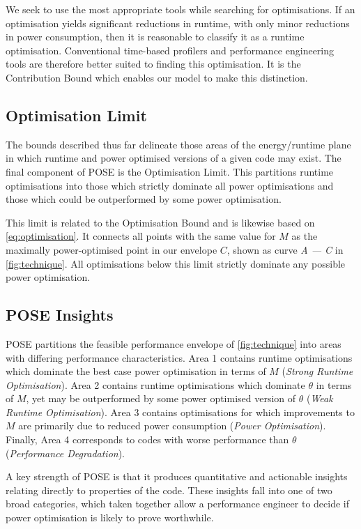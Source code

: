 We seek to use the most appropriate tools while searching for optimisations.
If an optimisation yields significant reductions in runtime, with only minor reductions in power consumption, then it is reasonable to classify it as a runtime optimisation.
Conventional time-based profilers and performance engineering tools are therefore better suited to finding this optimisation.
It is the Contribution Bound which enables our model to make this distinction.

\subsection{Optimisation Limit}
\noindent
The bounds described thus far delineate those areas of the energy/runtime plane in which runtime and power optimised versions of a given code may exist.
The final component of POSE is the Optimisation Limit.
This partitions runtime optimisations into those which strictly dominate all power optimisations and those which could be outperformed by some power optimisation.

This limit is related to the Optimisation Bound and is likewise based on \autoref{eq:optimisation}.
It connects all points with the same value for $M$ as the maximally power-optimised point in our envelope $C$, shown as curve \emph{A --- C} in \autoref{fig:technique}.
All optimisations below this limit strictly dominate any possible power optimisation.

\subsection{POSE Insights}
\noindent

POSE partitions the feasible performance envelope of \autoref{fig:technique} into areas with differing performance characteristics.
Area 1 contains runtime optimisations which dominate the best case power optimisation in terms of $M$ (\emph{Strong Runtime Optimisation}).
Area 2 contains runtime optimisations which dominate $\theta$ in terms of $M$, yet may be outperformed by some power optimised version of $\theta$ (\emph{Weak Runtime Optimisation}).
Area 3 contains optimisations for which improvements to $M$ are primarily due to reduced power consumption (\emph{Power Optimisation}).
Finally, Area 4 corresponds to codes with worse performance than $\theta$ (\emph{Performance Degradation}).

A key strength of POSE is that it produces quantitative and actionable insights relating directly to properties of the code.
These insights fall into one of two broad categories, which taken together allow a performance engineer to decide if power optimisation is likely to prove worthwhile.


